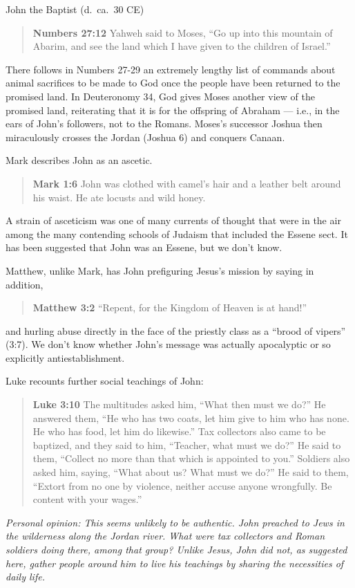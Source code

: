 \documentclass[8pt]{article}
\newcommand{\quotesize}{\large{}}
\newenvironment{quotetext}{\begin{quote}\quotesize}{\end{quote}}
\newcommand{\bible}[2]{\begin{quotetext}\textbf{#1} #2\end{quotetext}}
\newcommand{\matthew}[2]{\bible{Matthew #1}{#2}}
\newcommand{\gospelmark}[2]{\bible{Mark #1}{#2}}
\newcommand{\luke}[2]{\bible{Luke #1}{#2}}
\newcommand{\personal}[1]{\emph{Personal opinion:\/ #1}}
\begin{document}
\begin{section}{John the Baptist (d.~ca.~30 CE)}
\bible{Numbers 27:12}{Yahweh said to Moses, ``Go up into this mountain of Abarim, and see the land which I have given to the children of Israel.''}

There follows in Numbers 27-29 an extremely lengthy list of commands about animal sacrifices to be made to God
once the people have been returned to the promised land. In Deuteronomy 34, God gives Moses another view of the
promised land, reiterating that it is for the offspring of Abraham --- i.e., in the ears of John's followers, not
to the Romans.
Moses's successor Joshua then miraculously crosses the Jordan (Joshua 6) and conquers Canaan.

Mark describes John as an ascetic.

\gospelmark{1:6}{John was clothed with camel’s hair and a leather belt around his waist. He ate locusts
and wild honey.}

A strain of asceticism was one of many currents of thought that were in the air among the many
contending schools of Judaism that included the Essene sect. It has been suggested that John was an Essene, but we don't know.

Matthew, unlike Mark, has John prefiguring Jesus's mission by saying
in addition,

\matthew{3:2}{``Repent, for the Kingdom of Heaven is at hand!''}

and hurling abuse directly in the face of the priestly class as a ``brood of vipers'' (3:7). We don't
know whether John's message was actually apocalyptic or so explicitly antiestablishment.

Luke recounts further social teachings of John:

\luke{3:10}{The multitudes asked him, ``What then must we do?''
 He answered them, ``He who has two coats, let him give to him who has none. He who has food, let him do likewise.''
 Tax collectors also came to be baptized, and they said to him, ``Teacher, what must we do?''
 He said to them, ``Collect no more than that which is appointed to you.''
 Soldiers also asked him, saying, ``What about us? What must we do?''
He said to them, ``Extort from no one by violence, neither accuse anyone wrongfully. Be content with your wages.''}

\personal{This seems unlikely to be authentic. John preached to Jews in the wilderness along the Jordan river. What were
tax collectors and Roman soldiers doing there, among that group? Unlike Jesus, John did not, as suggested here,
gather people around him to live his teachings by sharing the necessities of daily life.}


\end{section}
\end{document}
